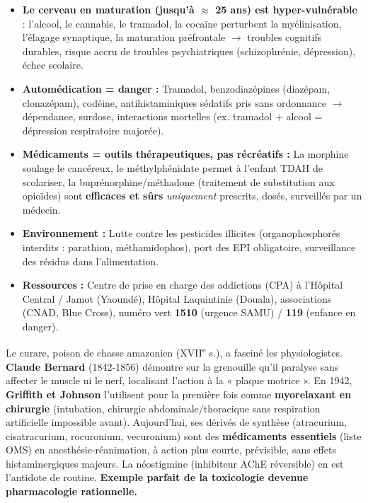 \documentclass[11pt]{article}
\begin{document}
\begin{aretenir}
\begin{itemize}
    \item \textbf{Le cerveau en maturation (jusqu'à $\approx$ 25 ans) est hyper-vulnérable} : l'alcool, le cannabis, le tramadol, la cocaïne perturbent la myélinisation, l'élagage synaptique, la maturation préfrontale $\rightarrow$ troubles cognitifs durables, risque accru de troubles psychiatriques (schizophrénie, dépression), échec scolaire.
    \item \textbf{Automédication = danger :} Tramadol, benzodiazépines (diazépam, clonazépam), codéine, antihistaminiques sédatifs pris sans ordonnance $\rightarrow$ dépendance, surdose, interactions mortelles (ex. tramadol + alcool = dépression respiratoire majorée).
    \item \textbf{Médicaments = outils thérapeutiques, pas récréatifs :} La morphine soulage le cancéreux, le méthylphénidate permet à l'enfant TDAH de scolariser, la buprénorphine/méthadone (traitement de substitution aux opioïdes) sont \textbf{efficaces et sûrs} \emph{uniquement} prescrits, dosés, surveillés par un médecin.
    \item \textbf{Environnement :} Lutte contre les pesticides illicites (organophosphorés interdits : parathion, méthamidophos), port des EPI obligatoire, surveillance des résidus dans l'alimentation.
    \item \textbf{Ressources :} Centre de prise en charge des addictions (CPA) à l'Hôpital Central / Jamot (Yaoundé), Hôpital Laquintinie (Douala), associations (CNAD, Blue Cross), numéro vert \textbf{1510} (urgence SAMU) / \textbf{119} (enfance en danger).
\end{itemize}
\end{aretenir}

\begin{savaistu}
Le curare, poison de chasse amazonien (XVII\textsuperscript{e} s.), a fasciné les physiologistes. \textbf{Claude Bernard} (1842-1856) démontre sur la grenouille qu'il paralyse sans affecter le muscle ni le nerf, localisant l'action à la « plaque motrice ». En 1942, \textbf{Griffith et Johnson} l'utilisent pour la première fois comme \textbf{myorelaxant en chirurgie} (intubation, chirurgie abdominale/thoracique sans respiration artificielle impossible avant). Aujourd'hui, ses dérivés de synthèse (atracurium, cisatracurium, rocuronium, vecuronium) sont des \textbf{médicaments essentiels} (liste OMS) en anesthésie-réanimation, à action plus courte, prévisible, sans effets histaminergiques majeurs. La néostigmine (inhibiteur AChE réversible) en est l'antidote de routine. \textbf{Exemple parfait de la toxicologie devenue pharmacologie rationnelle.}
\end{savaistu}
\end{document}
